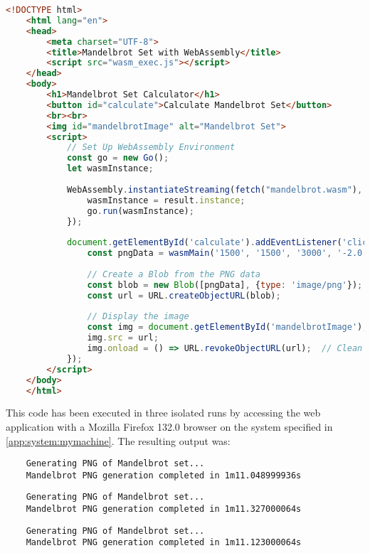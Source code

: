 \begin{lstlisting}[language=html, frame=tb, caption={Execute \emph{mandelbrot.wasm} in Browser (HTML)}]
    <!DOCTYPE html>
    <html lang="en">
    <head>
        <meta charset="UTF-8">
        <title>Mandelbrot Set with WebAssembly</title>
        <script src="wasm_exec.js"></script>
    </head>
    <body>
        <h1>Mandelbrot Set Calculator</h1>
        <button id="calculate">Calculate Mandelbrot Set</button>
        <br><br>
        <img id="mandelbrotImage" alt="Mandelbrot Set">
        <script>                 
            // Set Up WebAssembly Environment
            const go = new Go();
            let wasmInstance;
    
            WebAssembly.instantiateStreaming(fetch("mandelbrot.wasm"), go.importObject).then((result) => {
                wasmInstance = result.instance;
                go.run(wasmInstance);
            });
    
            document.getElementById('calculate').addEventListener('click', () => {
                const pngData = wasmMain('1500', '1500', '3000', '-2.0', '1.0', '-1.5', '1.5');
                
                // Create a Blob from the PNG data
                const blob = new Blob([pngData], {type: 'image/png'});
                const url = URL.createObjectURL(blob);
                              
                // Display the image
                const img = document.getElementById('mandelbrotImage');
                img.src = url;
                img.onload = () => URL.revokeObjectURL(url);  // Clean up the object URL
            });
        </script>
    </body>
    </html>
\end{lstlisting}

This code has been executed in three isolated runs by accessing the web application with a Mozilla Firefox 132.0 \cite{background:firefox} browser on the system specified in \ref{app:system:mymachine}. The resulting output was:
\begin{lstlisting}
    Generating PNG of Mandelbrot set... 
    Mandelbrot PNG generation completed in 1m11.048999936s
\end{lstlisting}
\begin{lstlisting}
    Generating PNG of Mandelbrot set... 
    Mandelbrot PNG generation completed in 1m11.327000064s
\end{lstlisting}
\begin{lstlisting}
    Generating PNG of Mandelbrot set... 
    Mandelbrot PNG generation completed in 1m11.123000064s
\end{lstlisting}

